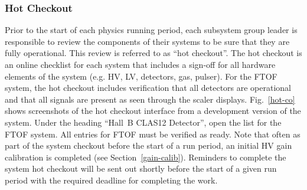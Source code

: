 \documentclass[12pt]{article}
\begin{document}
\subsubsection{Hot Checkout}
\label{checkout}

Prior to the start of each physics running period, each subsystem group leader is responsible to
review the components of their systems to be sure that they are fully operational. This review is
referred to as ``hot checkout''. The hot checkout is an online checklist for each system that
includes a sign-off for all hardware elements of the system (e.g. HV, LV, detectors, gas, pulser).
For the FTOF system, the hot checkout includes verification that all detectors are operational and
that all signals are present as seen through the scaler displays. Fig.~\ref{hot-co} shows screenshots 
of the hot checkout interface from a development version of the system. Under the heading ``Hall~B
CLAS12 Detector'', open the list for the FTOF system. All entries for FTOF must be verified as ready.
Note that often as part of the system checkout before the start of a run period, an initial HV gain 
calibration is completed (see Section~\ref{gain-calib}). Reminders to complete the system hot checkout
will be sent out shortly before the start of a given run period with the required deadline for
completing the work.
\end{document}
